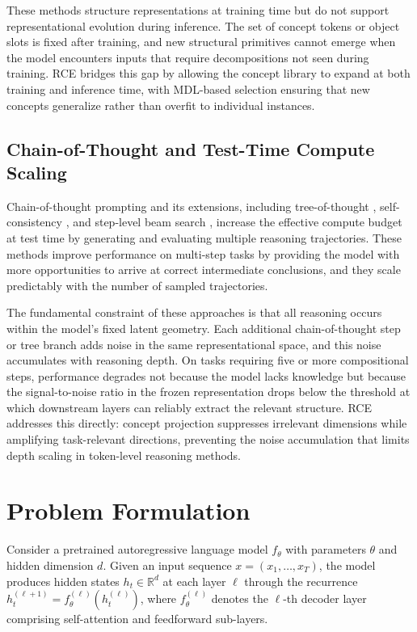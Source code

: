 \documentclass[11pt]{article}
\begin{document}
These methods structure representations at training time but do not support representational evolution during inference. The set of concept tokens or object slots is fixed after training, and new structural primitives cannot emerge when the model encounters inputs that require decompositions not seen during training. RCE bridges this gap by allowing the concept library to expand at both training and inference time, with MDL-based selection ensuring that new concepts generalize rather than overfit to individual instances.

\subsection{Chain-of-Thought and Test-Time Compute Scaling}

Chain-of-thought prompting \cite{wei2022cot} and its extensions, including tree-of-thought \cite{yao2023tot}, self-consistency \cite{wang2023selfconsistency}, and step-level beam search \cite{lightman2023prm}, increase the effective compute budget at test time by generating and evaluating multiple reasoning trajectories. These methods improve performance on multi-step tasks by providing the model with more opportunities to arrive at correct intermediate conclusions, and they scale predictably with the number of sampled trajectories.

The fundamental constraint of these approaches is that all reasoning occurs within the model's fixed latent geometry. Each additional chain-of-thought step or tree branch adds noise in the same representational space, and this noise accumulates with reasoning depth. On tasks requiring five or more compositional steps, performance degrades not because the model lacks knowledge but because the signal-to-noise ratio in the frozen representation drops below the threshold at which downstream layers can reliably extract the relevant structure. RCE addresses this directly: concept projection suppresses irrelevant dimensions while amplifying task-relevant directions, preventing the noise accumulation that limits depth scaling in token-level reasoning methods.

\section{Problem Formulation}

Consider a pretrained autoregressive language model $f_\theta$ with parameters $\theta$ and hidden dimension $d$. Given an input sequence $x = (x_1, \ldots, x_T)$, the model produces hidden states $h_t \in \mathbb{R}^d$ at each layer $\ell$ through the recurrence $h_t^{(\ell+1)} = f_\theta^{(\ell)}(h_t^{(\ell)})$, where $f_\theta^{(\ell)}$ denotes the $\ell$-th decoder layer comprising self-attention and feedforward sub-layers.
\end{document}
